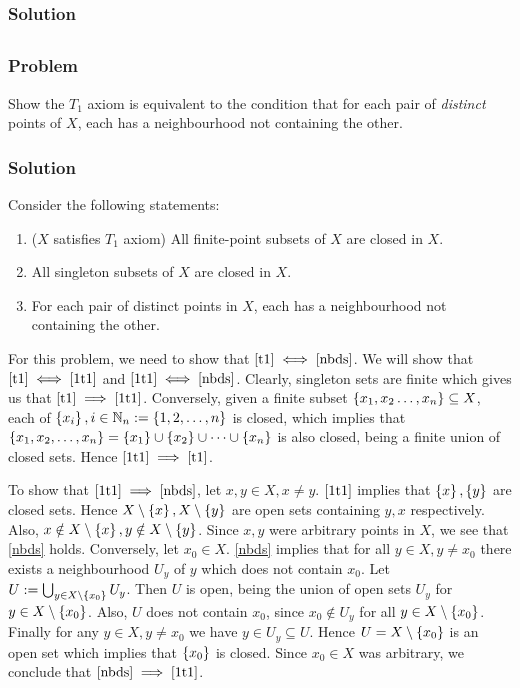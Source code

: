\subsubsection{Solution}
\todo


\subsection{}
\subsubsection{Problem}
Show the $T_1$ axiom is equivalent to the condition that for each pair of \emph{distinct} points of $X$, each has a neighbourhood not containing the other.

\subsubsection{Solution}
Consider the following  statements:
\begin{enumerate}
\item\label{t1} ($X$ satisfies $T_1$ axiom) All finite-point subsets of $X$ are closed in $X$.
\item\label{1t1} All singleton subsets of $X$ are closed in $X$.
\item\label{nbds} For each pair of distinct points in $X$, each has a neighbourhood not containing the other.
\end{enumerate}
For this problem, we need to show that $\ref{t1} \iff \ref{nbds}$. We will show that $\ref{t1} \iff \ref{1t1}$ and $\ref{1t1} \iff \ref{nbds}$.
Clearly, singleton sets are finite which gives us that $\ref{t1} \implies \ref{1t1}$. Conversely, given a finite subset $\left\{ x_1, x_2 \dots, x_n \right\} \subseteq X$, each of $\left\{ x_i \right\}, i \in \mathbb N_n := \left\{ 1, 2, \dots, n \right\}$ is closed, which implies that $\left\{ x_1, x_2, \dots, x_n \right\} = \left\{ x_1 \right\} \cup \left\{ x_2 \right\} \cup \dots \cup \left\{ x_n \right\}$ is also closed, being a finite union of closed sets. Hence $\ref{1t1} \implies \ref{t1}$.
\medskip

To show that $\ref{1t1} \implies \ref{nbds}$, let $x,y \in X, x \neq y$. $\ref{1t1}$ implies that $\left\{ x \right\}, \left\{ y \right\}$ are closed sets. Hence $X\setminus\left\{ x \right\}, X\setminus\left\{ y \right\}$ are open sets containing $y, x$ respectively. Also, $x \notin X\setminus\left\{ x \right\}, y \notin X\setminus\left\{ y \right\}$. Since $x, y$ were arbitrary points in $X$, we see that \ref{nbds} holds. Conversely, let $x_0 \in X$. \ref{nbds} implies that for all $y \in X, y \neq x_0$ there exists a neighbourhood $U_y$ of $y$ which does not contain $x_0$. Let $U := \bigcup_{y \in X\setminus\left\{ x_0 \right\}}U_y$. Then $U$ is open, being the union of open sets $U_y$ for $y \in X\setminus\left\{ x_0 \right\}$. Also, $U$ does not contain $x_0$, since $x_0 \notin U_y$ for all $y \in X\setminus\left\{ x_0 \right\}$. Finally for any $y \in X, y \neq x_0$ we have $y \in U_y \subseteq U$. Hence $U = X\setminus\left\{ x_0 \right\}$ is an open set which implies that $\left\{ x_0 \right\}$ is closed. Since $x_0 \in X$ was arbitrary, we conclude that $\ref{nbds} \implies \ref{1t1}$. 

